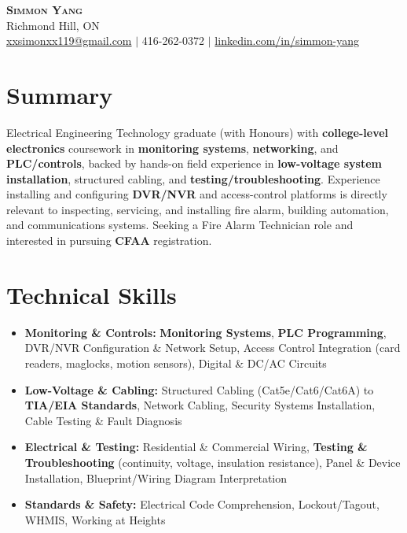\documentclass[letterpaper,11pt]{article}
\begin{document}
\begin{center}
    \textbf{\Huge \scshape Simmon Yang} \\ \vspace{1pt}
    Richmond Hill, ON \\
    \href{mailto:xxsimonxx119@gmail.com}{xxsimonxx119@gmail.com} $|$ 416-262-0372 $|$
    \href{https://www.linkedin.com/in/simmon-yang/}{linkedin.com/in/simmon-yang}
\end{center}

\section{Summary}
Electrical Engineering Technology graduate (with Honours) with \textbf{college-level electronics} coursework in \textbf{monitoring systems}, \textbf{networking}, and \textbf{PLC/controls}, backed by hands-on field experience in \textbf{low-voltage system installation}, structured cabling, and \textbf{testing/troubleshooting}. Experience installing and configuring \textbf{DVR/NVR} and access-control platforms is directly relevant to inspecting, servicing, and installing fire alarm, building automation, and communications systems. Seeking a Fire Alarm Technician role and interested in pursuing \textbf{CFAA} registration.

\section{Technical Skills}
\begin{itemize}[leftmargin=0.15in]
  \item \textbf{Monitoring \& Controls:} \textbf{Monitoring Systems}, \textbf{PLC Programming}, DVR/NVR Configuration \& Network Setup, Access Control Integration (card readers, maglocks, motion sensors), Digital \& DC/AC Circuits
  \item \textbf{Low-Voltage \& Cabling:} Structured Cabling (Cat5e/Cat6/Cat6A) to \textbf{TIA/EIA Standards}, Network Cabling, Security Systems Installation, Cable Testing \& Fault Diagnosis
  \item \textbf{Electrical \& Testing:} Residential \& Commercial Wiring, \textbf{Testing \& Troubleshooting} (continuity, voltage, insulation resistance), Panel \& Device Installation, Blueprint/Wiring Diagram Interpretation
  \item \textbf{Standards \& Safety:} Electrical Code Comprehension, Lockout/Tagout, WHMIS, Working at Heights
\end{itemize}
\end{document}
